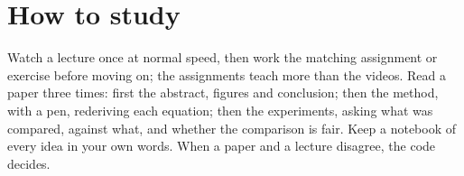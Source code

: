 \section{How to study}

Watch a lecture once at normal speed, then work the matching assignment or exercise before moving on; the
assignments teach more than the videos. Read a paper three times: first the abstract, figures and conclusion;
then the method, with a pen, rederiving each equation; then the experiments, asking what was compared, against
what, and whether the comparison is fair. Keep a notebook of every idea in your own words. When a paper and a
lecture disagree, the code decides.
